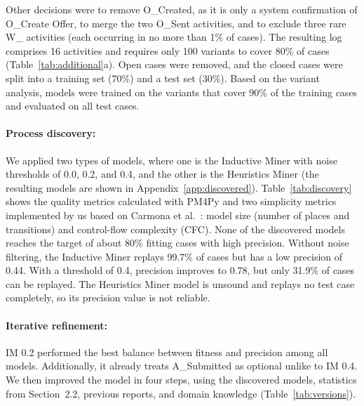 \documentclass[
  english,        %
  font=times,     %
  twocolumn,      %
]{tumarticle}
\begin{document}
Other decisions were to remove O\_Created, as it is only a system confirmation of O\_Create Offer, to merge the two O\_Sent activities, and to exclude three rare W\_ activities (each occurring in no more than 1\% of cases). The resulting log comprises 16 activities and requires only 100 variants to cover 80\% of cases (Table~\ref{tab:additional}a). Open cases were removed, and the closed cases were split into a training set (70\%) and a test set (30\%). Based on the variant analysis, models were trained on the variants that cover 90\% of the training cases and evaluated on all test cases.

\paragraph{Process discovery:}
We applied two types of models, where one is the Inductive Miner \cite{leemans2014} with noise thresholds of 0.0, 0.2, and 0.4, and the other is the Heuristics Miner \cite{weijters2006} (the resulting models are shown in Appendix~\ref{app:discovered}). Table~\ref{tab:discovery} shows the quality metrics calculated with PM4Py and two simplicity metrics implemented by us based on Carmona et al.\ \cite{carmona2018}: model size (number of places and transitions) and control-flow complexity (CFC). None of the discovered models reaches the target of about 80\% fitting cases with high precision. Without noise filtering, the Inductive Miner replays 99.7\% of cases but has a low precision of 0.44. With a threshold of 0.4, precision improves to 0.78, but only 31.9\% of cases can be replayed. The Heuristics Miner model is unsound and replays no test case completely, so its precision value is not reliable.

\begin{table}[!htb]
    \caption{Quality of the discovered models on the log with 16 activities (test set). Fitting cases, average fitness and precision are alignment-based; Simpl.\ (arc) is the PM4Py simplicity; Size and CFC are our own simplicity metrics. $^{*}$\,Token-based replay, since alignments are not possible for the unsound HM model.}
    \label{tab:discovery}
    \centering
    \footnotesize
    \setlength{\tabcolsep}{2pt}
    
\end{table}

\paragraph{Iterative refinement:}
IM 0.2 performed the best balance between fitness and precision among all models. Additionally, it already treats A\_Submitted as optional unlike to IM 0.4. We then improved the model in four steps, using the discovered models, statistics from Section~2.2, previous reports, and domain knowledge (Table~\ref{tab:versions}).
\end{document}
